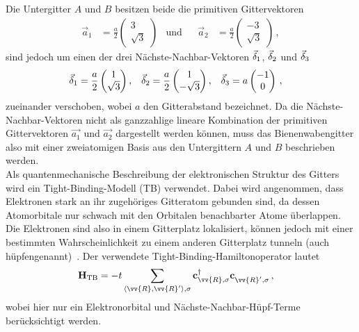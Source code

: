 Die Untergitter $A$ und $B$ besitzen beide die primitiven Gittervektoren 
\begin{align}
    \vec{a}_1 &= \frac{a}{2} \begin{pmatrix}3 \\ \sqrt{3}\end{pmatrix} & \text{und} & & \vec{a}_2 &= \frac{a}{2} \begin{pmatrix}-3 \\ \sqrt{3}\end{pmatrix} \, ,
\end{align}
sind jedoch um einen der drei Nächste-Nachbar-Vektoren ${\vec{\delta}}_1$, ${\vec{\delta}}_2$ und ${\vec{\delta}}_3$ 
\begin{align}
    {\vec{\delta}_{1}} &= \frac{a}{2} \begin{pmatrix}1 \\ \sqrt{3}\end{pmatrix}, & {\vec{\delta}_{2}} &= \frac{a}{2} \begin{pmatrix}1 \\ -\sqrt{3}\end{pmatrix}, & {\vec{\delta}_{3}} &= a \begin{pmatrix}-1 \\ 0\end{pmatrix} \, ,
    \label{eq:nn-vektoren}
\end{align}
zueinander verschoben, wobei $a$ den Gitterabstand bezeichnet. 
Da die Nächste-Nachbar-Vektoren nicht als ganzzahlige lineare Kombination der primitiven Gittervektoren $\vec{a_1}$ und $\vec{a_2}$
dargestellt werden können, muss das Bienenwabengitter also mit einer zweiatomigen Basis aus den Untergittern $A$ und $B$ beschrieben werden.\\
Als quantenmechanische Beschreibung der elektronischen Struktur des Gitters wird ein Tight-Binding-Modell (TB) verwendet. 
Dabei wird angenommen, dass Elektronen stark an ihr zugehöriges Gitteratom gebunden sind, da dessen Atomorbitale nur schwach mit den Orbitalen benachbarter Atome überlappen. 
Die Elektronen sind also in einem Gitterplatz lokalisiert, können jedoch mit einer bestimmten Wahrscheinlichkeit zu einem anderen Gitterplatz tunneln (auch \glqq hüpfen\grqq  genannt)~\cite{ashcroft_solid_1976}. 
Der verwendete Tight-Binding-Hamiltonoperator lautet
\begin{align}
    \oH_\text{TB} &= -t \sum_{\expval{\vv{R}, \vv{R}'}, \sigma} \ofed{\vv{R}, \sigma} \ofe{\vv{R}', \sigma} \label{eq:TB}\, ,
\end{align}
wobei hier nur ein Elektronorbital und Nächste-Nachbar-Hüpf-Terme berücksichtigt werden.  
